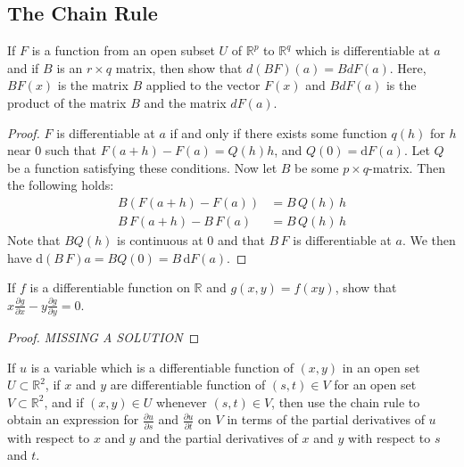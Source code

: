 \documentclass[12pt]{book}
\newcommand{\R}{\mathbb{R}}
\newenvironment{exercise}[2][Exercise]{\begin{trivlist}
\item[\hskip \labelsep {\bfseries #1}\hskip \labelsep {\bfseries #2.}]}{\end{trivlist}}
\begin{document}
\begin{exercise}{7.2.7}
\section{The Chain Rule}


\begin{exercise}{9.3.1}
	If $F$ is a function from an open subset $U$ of $\R^p$ to $\R^q$ which is differentiable at $a$ and if $B$ is an $r \times q$ matrix, then show that $d( BF) (a) = B d F(a)$. Here, $B F(x)$ is the matrix $B$ applied to the vector $F(x)$ and $BdF(a)$ is the product of the matrix $B$ and the matrix $dF(a)$.

	\begin{proof}
    $F$ is differentiable at $a$ if and only if there exists some function $q(h)$ for $h$ near $0$ such that $F(a+h)-F(a)=Q(h) h$, and $Q(0)=\text{d}F(a)$. Let $Q$ be a function satisfying these conditions. Now let $B$ be some $p\times q$-matrix. Then the following holds:
        \begin{align*}
        B \left(F(a+h)-F(a)\right) &= B\, Q(h)\, h  \\
          B \, F(a+h) - B \, F(a)  &= B\, Q(h)\, h
        \end{align*}
    Note that $B Q(h)$ is continuous at 0 and that $B \, F$ is differentiable at $a$. We then have $\text{d}(B\,F)a = B Q(0) = B\, \text{d} F(a)$.
	\end{proof}
\end{exercise}



\begin{exercise}{9.3.4}
	If $f$ is a differentiable function on $\R$ and $g(x, y) = f(x y)$, show  that $x \frac{\partial g}{\partial x} - y \frac{\partial g}{\partial y} = 0$.

	\begin{proof}
	\emph{MISSING A SOLUTION}
	\end{proof}
\end{exercise}




\begin{exercise}{9.3.6}
	If $u$ is a variable which is a differentiable function of $(x,y)$ in an open set $U \subset \R^2$, if $x$ and $y$ are differentiable function of $(s,t) \in V$ for an open set $V \subset \R^2$, and if $(x,y) \in U$ whenever $(s,t) \in V$, then use the chain rule  to  obtain an expression for $\frac{\partial u}{\partial s}$ and $\frac{\partial u}{\partial t}$ on $V$ in terms of the partial derivatives of $u$ with respect to $x$ and $y$ and the partial derivatives of $x$ and $y$ with respect to $s$ and $t$.


\end{exercise}
\end{exercise}
\end{document}
